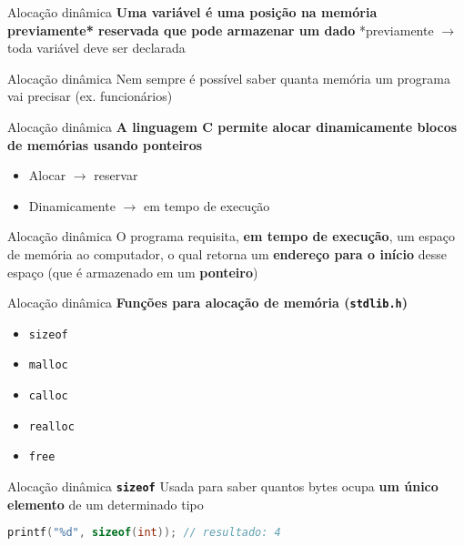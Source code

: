 \documentclass[10pt]{beamer}
\subtitle{Aula 5}
\date{27 de novembro de 2019}
\begin{document}
\maketitle

\begin{frame}{Alocação dinâmica}
  \huge
  \textbf{Uma variável é uma \alert{posição na memória previamente* reservada} que pode armazenar um dado}
  \vfill
  *previamente $\rightarrow$ toda variável deve ser \alert{declarada}
\end{frame}

\begin{frame}{Alocação dinâmica}
  \huge
  Nem sempre é possível saber quanta memória um programa vai precisar (ex. funcionários)
\end{frame}

\begin{frame}{Alocação dinâmica}
  \huge
  \textbf{A linguagem C permite \alert{alocar dinamicamente} blocos de memórias usando ponteiros}
  \vfill
  \Large
  \setlength{\leftmargini}{0pt}
  \begin{itemize}
      \item [] Alocar $\rightarrow$ reservar
      \item [] Dinamicamente $\rightarrow$ em tempo de execução
  \end{itemize}
\end{frame}

\begin{frame}{Alocação dinâmica}
  \huge
  O programa requisita, \textbf{em tempo de execução}, um espaço de memória ao computador, o qual retorna um \textbf{endereço para o início} desse espaço (que é armazenado em um \textbf{ponteiro})
\end{frame}

\begin{frame}{Alocação dinâmica}
  \huge
  \textbf{Funções para alocação de memória (\texttt{stdlib.h})}
  \vfill
  \LARGE
  \begin{itemize}
    \item \texttt{sizeof}
    \item \texttt{malloc}
    \item \texttt{calloc}
    \item \texttt{realloc}
    \item \texttt{free}
  \end{itemize}
\end{frame}

\begin{frame}[fragile]{Alocação dinâmica}
  \huge
  \textbf{\texttt{sizeof}}
  \vfill
  Usada para saber quantos bytes ocupa \textbf{um único elemento} de um determinado tipo
  \vfill
  \large
  \begin{lstlisting}[language=C]
printf("%d", sizeof(int)); // resultado: 4
  \end{lstlisting}
\end{frame}
\end{document}
